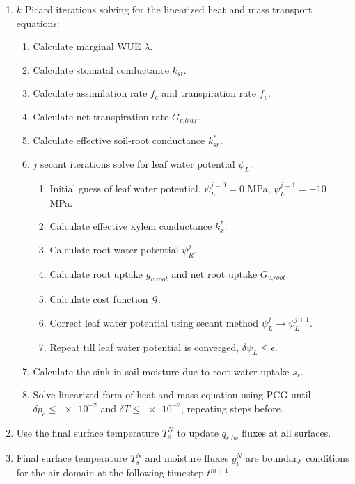 \begin{enumerate}
	\item $k$ Picard iterations solving for the linearized heat and mass transport equations:
		\begin{enumerate}[label=(\alph*)]
			\item Calculate marginal WUE $\lambda$. %
			\item Calculate stomatal conductance $k_{\textit{st}}$.
			\item Calculate assimilation rate $f_c$ and transpiration rate $f_v$.
			\item Calculate net transpiration rate $G_{\textit{v,leaf}}$.
			\item Calculate effective soil-root conductance $k_{sr}^*$.
			\item $j$ secant iterations solve for leaf water potential $\psi_L$.
				\begin{enumerate}[label=(\alph*)]
					\item Initial guess of leaf water potential, $\psi_L^{j=0} = 0$ MPa, $\psi_L^{j=1} = -10$ MPa.
					\item Calculate effective xylem conductance $k_x^*$.
					\item Calculate root water potential $\psi_R^j$.
					\item Calculate root uptake $g_{\textit{v,root}}$ and net root uptake $G_{\textit{v,root}}$.
					\item Calculate cost function $\mathcal{G}$.
					\item Correct leaf water potential using secant method $\psi_L^{j}\rightarrow\psi_L^{j+1}$.
					\item Repeat till leaf water potential is converged, $\delta \psi_L \le \epsilon$.
				\end{enumerate}
			\item Calculate the sink in soil moisture due to root water uptake $s_{r}$.
			\item Solve linearized form of heat and mass equation using PCG until $\delta p_c \le \num{e-2} $ and $\delta T \le  \num{e-2}$, repeating steps before.
		\end{enumerate}
	\item Use the final surface temperature $T_s^{N}$ to update $q_{\textit{r,lw}}$ fluxes at all surfaces.
	\item Final surface temperature $T_s^N$ and moisture fluxes $g_{v}^N$ are boundary conditions for the air domain at the following timestep $t^{m+1}$.
\end{enumerate}
